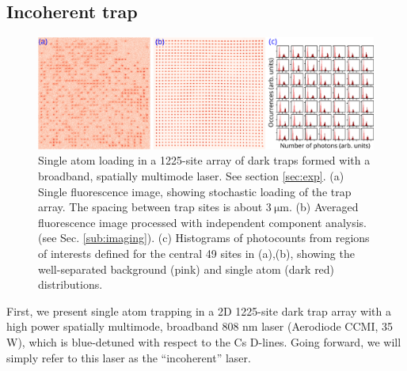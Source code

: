 \subsection{Incoherent trap}\label{sub:incoherent}
\begin{figure}[!t]
    \centering
    \includegraphics[width=\textwidth]{Images/figure4.eps}
    \caption{Single atom loading in a 1225-site array of dark traps formed with a broadband, spatially multimode laser. See section \ref{sec:exp}. (a) Single fluorescence image, showing stochastic loading of the trap array. The spacing between trap sites is about $3~\mathrm{ \mu m}$. (b) Averaged fluorescence image processed with independent component analysis. (see Sec. \ref{sub:imaging}). (c) Histograms of photocounts from regions of interests defined for the central 49 sites in (a),(b), showing the well-separated background (pink) and single atom (dark red) distributions.}
    \label{fig:bigarray}
\end{figure}
First, we present single atom trapping in a 2D 1225-site  dark trap array with a high power spatially multimode, broadband 808 nm laser (Aerodiode CCMI, 35 W), which is blue-detuned with respect to  the Cs D-lines. Going forward, we will simply refer to this laser as the ``incoherent'' laser. 


